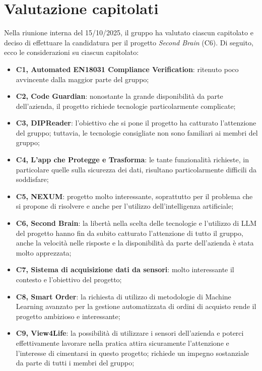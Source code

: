 \documentclass[a4paper,10pt]{article}
\begin{document}
\section*{Valutazione capitolati}
Nella riunione interna del 15/10/2025, il gruppo ha valutato ciascun capitolato e deciso di effettuare la candidatura per il progetto \textit{Second Brain} (C6). Di seguito, ecco le considerazioni su ciascun capitolato:
\begin{itemize}
    \item \textbf{C1, Automated EN18031 Compliance Verification}: ritenuto poco avvincente dalla maggior parte del gruppo;
    \item \textbf{C2, Code Guardian}: nonostante la grande disponibilità da parte dell'azienda, il progetto richiede tecnologie particolarmente complicate;
    \item \textbf{C3, DIPReader}: l'obiettivo che si pone il progetto ha catturato l'attenzione del gruppo; tuttavia, le tecnologie consigliate non sono familiari ai membri del gruppo;
    \item \textbf{C4, L'app che Protegge e Trasforma}: le tante funzionalità richieste, in particolare quelle sulla sicurezza dei dati, risultano particolarmente difficili da soddisfare;
    \item \textbf{C5, NEXUM}: progetto molto interessante, soprattutto per il problema che si propone di risolvere e anche per l'utilizzo dell'intelligenza artificiale;
    \item \textbf{C6, Second Brain}: la libertà nella scelta delle tecnologie e l'utilizzo di LLM del progetto hanno fin da subito catturato l'attenzione di tutto il gruppo, anche la velocità nelle risposte e la disponibilità da parte dell'azienda è stata molto apprezzata;
    \item \textbf{C7, Sistema di acquisizione dati da sensori}: molto interessante il contesto e l'obiettivo del progetto;
    \item \textbf{C8, Smart Order}: la richiesta di utilizzo di metodologie di Machine Learning avanzato per la gestione automatizzata di ordini di acquisto rende il progetto ambizioso e interessante;
    \item \textbf{C9, View4Life}: la possibilità di utilizzare i sensori dell'azienda e poterci effettivamente lavorare nella pratica attira sicuramente l'attenzione e l'interesse di cimentarsi in questo progetto; richiede un impegno sostanziale da parte di tutti i membri del gruppo;
\end{itemize}
\end{document}

